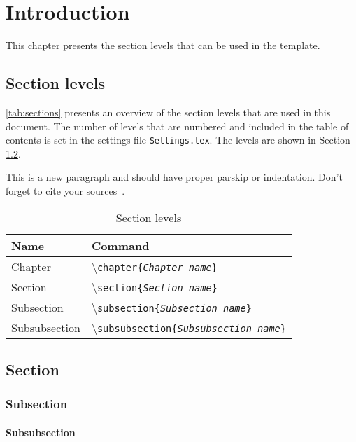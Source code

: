 \chapter{Introduction}
This chapter presents the section levels that can be used in the template. 

\section{Section levels}
\autoref{tab:sections} presents an overview of the section levels that are used in this document. The number of levels that are numbered and included in the table of contents is set in the settings file \texttt{Settings.tex}. The levels are shown in Section \ref{Section_ref}.

This is a new paragraph and should have proper parskip or indentation. Don't forget to cite your sources~\cite{Brajnik2008}. %

\begin{table}[h]
\centering
\caption{Section levels} %
\begin{tabular}{ll} \hline
Name & Command\\ \hline
Chapter & \textbackslash\texttt{chapter\{\emph{Chapter name}\}}\\
Section & \textbackslash\texttt{section\{\emph{Section name}\}}\\
Subsection & \textbackslash\texttt{subsection\{\emph{Subsection name}\}}\\
Subsubsection & \textbackslash\texttt{subsubsection\{\emph{Subsubsection name}\}}\\
\end{tabular}
\label{tab:sections}
\end{table}

\section{Section} \label{Section_ref}
\subsection{Subsection}
\subsubsection{Subsubsection}


